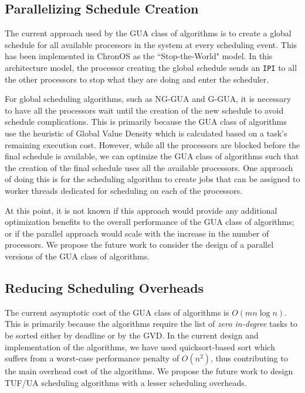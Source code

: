 \documentclass[12pt,dvips]{report}
\begin{document}
\subsection{Parallelizing Schedule Creation}
	
		The current approach used by the GUA class of algorithms is to create a global schedule for all available
		processors in the system at every scheduling event. This has been implemented in ChronOS
		as the ``Stop-the-World" model. In this architecture model, the processor creating the 
		global schedule sends an \texttt{IPI} to all the other processors to stop what they are doing
		and enter the scheduler. 
		
		For global scheduling algorithms, such as NG-GUA and G-GUA, it is necessary to 
		have all the processors wait until the creation of the new schedule to avoid 
		schedule complications. This is primarily because the GUA class of algorithms use the 
		heuristic of Global Value Density which is calculated based on a task's remaining execution
		cost. However, while all the processors are blocked before the final schedule is available, we
		can optimize the GUA class of algorithms such that the creation of the final schedule 
		uses all the available processors. One approach of doing this is for the scheduling algorithm to
		create jobs that can be assigned to worker threads dedicated for scheduling on each of the processors.
		
		At this point, it is not known if this approach would provide any additional optimization benefits
		to the overall performance of the GUA class of algorithms; or if the parallel approach
		would scale with the increase in the number of processors. We propose the future work to
		consider the design of a parallel versions of the GUA class of algorithms.
		
\subsection{Reducing Scheduling Overheads}
		
		The current asymptotic cost of the GUA class of algorithms is $O(m n\log n)$. This is primarily 
		because the algorithms require the list of \textit{zero in-degree} tasks to be sorted either
		by deadline or by the GVD. In the current design and implementation of the algorithms, we
		have used quicksort-based sort which suffers from a worst-case performance penalty of $O(n^2)$,
		thus contributing to the main overhead cost of the algorithms. We propose the future work to 
		design TUF/UA scheduling algorithms with a lesser scheduling overheads.
		
\end{document}
